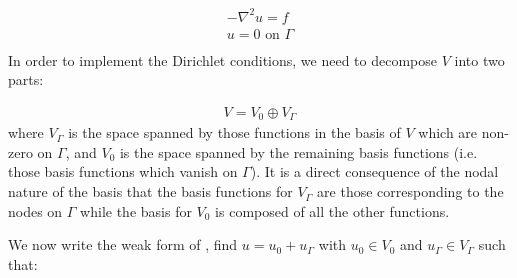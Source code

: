 \documentclass{book}
\begin{document}
\label{\detokenize{7_boundary_conditions:equation-poisson}}\begin{align}\label{equation:7_boundary_conditions:poisson}\!\begin{aligned}
-\nabla^2 u = f\\
u = 0  \textrm{ on }\Gamma\\
\end{aligned}\end{align}
In order to implement the Dirichlet conditions, we need to decompose
\(V\) into two parts:

\label{\detokenize{7_boundary_conditions:equation-7_boundary_conditions:0}}\begin{equation}\label{equation:7_boundary_conditions:7_boundary_conditions:0}
\begin{split}V = V_0 \oplus V_\Gamma\end{split}
\end{equation}
where \(V_\Gamma\) is the space spanned by those functions in the basis
of \(V\) which are non-zero on \(\Gamma\), and \(V_0\) is the space spanned
by the remaining basis functions (i.e.  those basis functions which
vanish on \(\Gamma\)). It is a direct consequence of the nodal nature of
the basis that the basis functions for \(V_\Gamma\) are those
corresponding to the nodes on \(\Gamma\) while the basis for \(V_0\) is
composed of all the other functions.

We now write the weak form of {\hyperref[\detokenize{7_boundary_conditions:equation-poisson}]{}}, find \(u=u_0 + u_\Gamma\)
with \(u_0 \in V_0\) and \(u_\Gamma \in V_\Gamma\) such that:
\end{document}
